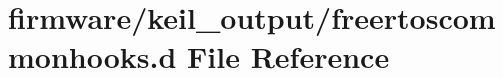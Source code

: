 \hypertarget{freertoscommonhooks_8d}{\section{firmware/keil\-\_\-output/freertoscommonhooks.d File Reference}
\label{freertoscommonhooks_8d}
}
